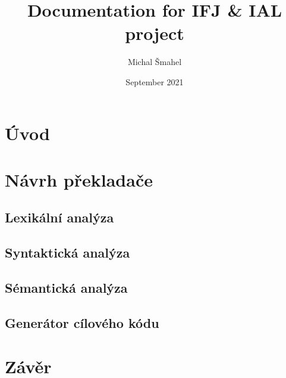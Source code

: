 \documentclass{article}
\title{Documentation for IFJ \& IAL project}
\author{Michal Šmahel}
\date{September 2021}
\begin{document}
\maketitle

\newpage
\tableofcontents
\newpage

\section{Úvod}

\section{Návrh překladače}
\subsection{Lexikální analýza}
\subsection{Syntaktická analýza}
\subsection{Sémantická analýza}
\subsection{Generátor cílového kódu}

\section{Závěr}
\end{document}
